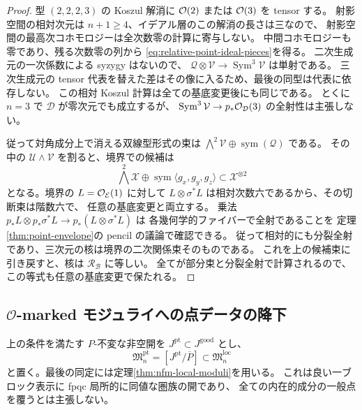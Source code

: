 \begin{proof}
型 $(2,2,2,3)$ の Koszul 解消に $\mathcal O(2)$ または $\mathcal O(3)$ を tensor する。
射影空間の相対次元は $n+1\geq4$、イデアル層のこの解消の長さは三なので、
射影空間の最高次コホモロジーは全次数零の計算に寄与しない。
中間コホモロジーも零であり、残る次数零の列から
\eqref{eq:relative-point-ideal-pieces}を得る。
二次生成元の一次係数による syzygy はないので、
$\mathcal Q\otimes\mathcal V\to\operatorname{Sym}^3\mathcal V$ は単射である。
三次生成元の tensor 代表を替えた差はその像に入るため、最後の同型は代表に依存しない。
この相対 Koszul 計算は全ての基底変更後にも同じである。
とくに $n=3$ で $\mathcal D$ が零次元でも成立するが、
$\operatorname{Sym}^3\mathcal V\to p_*\mathcal O_{\mathcal D}(3)$ の全射性は主張しない。

従って対角成分上で消える双線型形式の束は
$\bigwedge^2\mathcal V\oplus\operatorname{sym}(\mathcal Q)$ である。
その中の $\mathcal U\wedge\mathcal V$ を割ると、境界での候補は
\[
 \bigwedge^2\mathcal X\oplus
 \operatorname{sym}\langle g_x,g_y,g_z\rangle
 \subset\mathcal X^{\otimes2}
\]
となる。境界の $L=\mathcal O_{\mathcal E}(1)$ に対して
$L\otimes\sigma^*L$ は相対次数六であるから、その切断束は階数六で、
任意の基底変更と両立する。
乗法 $p_*L\otimes p_*\sigma^*L\to p_*(L\otimes\sigma^*L)$ は
各幾何学的ファイバーで全射であることを
定理\ref{thm:point-envelope}の pencil の議論で確認できる。
従って相対的にも分裂全射であり、三次元の核は境界の二次関係束そのものである。
これを上の候補束に引き戻すと、核は $\mathcal R_{\mathcal B}$ に等しい。
全てが部分束と分裂全射で計算されるので、この等式も任意の基底変更で保たれる。
\end{proof}

\subsection{$\mathcal O$-marked モジュライへの点データの降下}
\label{subsec:point-descent}

上の条件を満たす $P$-不変な非空開を $J^{\mathrm{pt}}\subset J^{\mathrm{good}}$ とし、
\[
 \mathfrak M_n^{\mathrm{pt}}
  =[J^{\mathrm{pt}}/\overline P]
  \subset\mathfrak M_n^{\mathrm{loc}}
\]
と置く。最後の同定には定理\ref{thm:nfm-local-moduli}を用いる。
これは良い一ブロック表示に fpqc 局所的に同値な圏族の開であり、
全ての内在的成分の一般点を覆うとは主張しない。

